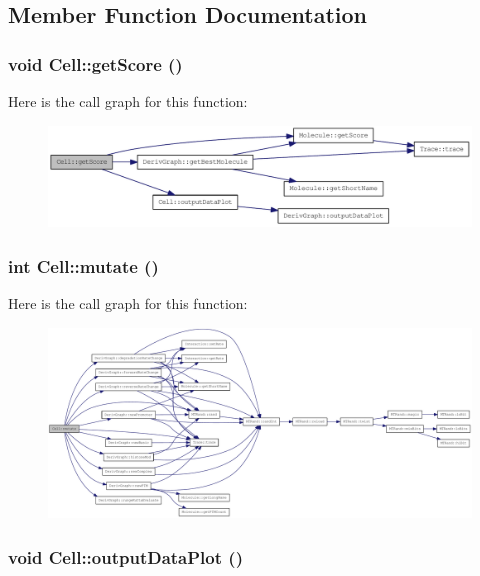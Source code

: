 \subsection{Member Function Documentation}
\hypertarget{classCell_aa36f550bfdb53c896ca1dd0be03eac70}{
\subsubsection[{getScore}]{\setlength{\rightskip}{0pt plus 5cm}void Cell::getScore ()}}
\label{classCell_aa36f550bfdb53c896ca1dd0be03eac70}


Here is the call graph for this function:\nopagebreak
\begin{figure}[H]
\begin{center}
\leavevmode
\includegraphics[width=326pt]{classCell_aa36f550bfdb53c896ca1dd0be03eac70_cgraph}
\end{center}
\end{figure}
\hypertarget{classCell_a555fa98c5f1dc8d7c88c7a24f69994ff}{
\subsubsection[{mutate}]{\setlength{\rightskip}{0pt plus 5cm}int Cell::mutate ()}}
\label{classCell_a555fa98c5f1dc8d7c88c7a24f69994ff}


Here is the call graph for this function:\nopagebreak
\begin{figure}[H]
\begin{center}
\leavevmode
\includegraphics[width=420pt]{classCell_a555fa98c5f1dc8d7c88c7a24f69994ff_cgraph}
\end{center}
\end{figure}
\hypertarget{classCell_a8e117526c56dda4d0d56d840d1558835}{
\subsubsection[{outputDataPlot}]{\setlength{\rightskip}{0pt plus 5cm}void Cell::outputDataPlot ()}}
\label{classCell_a8e117526c56dda4d0d56d840d1558835}


